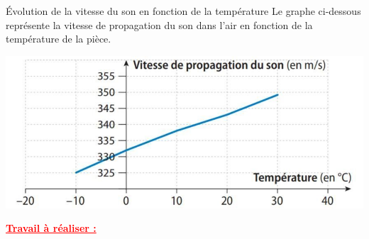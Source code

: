 \begin{doc}{\'{E}volution de la vitesse du son en fonction de la température}
Le graphe ci-dessous représente la vitesse de propagation du son dans l'air en fonction de la température de la pièce.
\begin{center}
    \includegraphics[scale=0.9]{Images/TP/TP7/Courbe_VitesseTemp.jpg}
  \end{center}

\end{doc}
\begin{large}
    \textbf{\textcolor{red}{\underline{Travail à réaliser :}}}
\end{large}
\\

